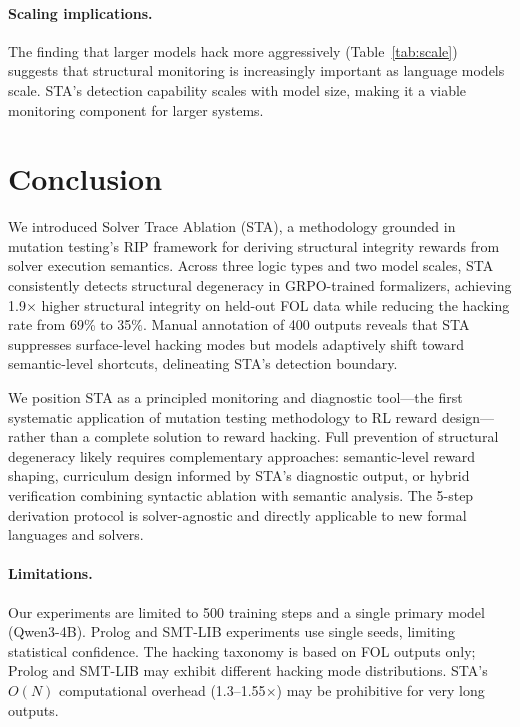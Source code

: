 \documentclass[11pt,a4paper]{article}
\begin{document}
\paragraph{Scaling implications.}
The finding that larger models hack more aggressively (Table~\ref{tab:scale}) suggests that structural monitoring is increasingly important as language models scale.
STA's detection capability scales with model size, making it a viable monitoring component for larger systems.

\section{Conclusion}

We introduced Solver Trace Ablation (STA), a methodology grounded in mutation testing's RIP framework for deriving structural integrity rewards from solver execution semantics.
Across three logic types and two model scales, STA consistently detects structural degeneracy in GRPO-trained formalizers, achieving 1.9$\times$ higher structural integrity on held-out FOL data while reducing the hacking rate from 69\% to 35\%.
Manual annotation of 400 outputs reveals that STA suppresses surface-level hacking modes but models adaptively shift toward semantic-level shortcuts, delineating STA's detection boundary.

We position STA as a principled monitoring and diagnostic tool---the first systematic application of mutation testing methodology to RL reward design---rather than a complete solution to reward hacking.
Full prevention of structural degeneracy likely requires complementary approaches: semantic-level reward shaping, curriculum design informed by STA's diagnostic output, or hybrid verification combining syntactic ablation with semantic analysis.
The 5-step derivation protocol is solver-agnostic and directly applicable to new formal languages and solvers.

\paragraph{Limitations.}
Our experiments are limited to 500 training steps and a single primary model (Qwen3-4B).
Prolog and SMT-LIB experiments use single seeds, limiting statistical confidence.
The hacking taxonomy is based on FOL outputs only; Prolog and SMT-LIB may exhibit different hacking mode distributions.
STA's $O(N)$ computational overhead (1.3--1.55$\times$) may be prohibitive for very long outputs.
\end{document}
